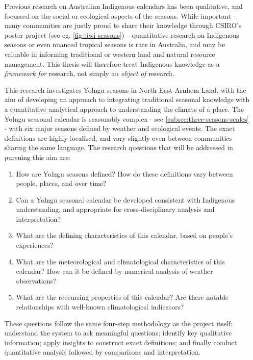 Previous research on Australian Indigenous calendars 
has been qualitative, and focussed on the social or ecological aspects of
the seasons.  While important -- many communities are justly proud to share
their knowledge through CSIRO's poster project (see eg. \cref{fig:tiwi-seasons})
-- quantitative research on Indigenous seasons or even nuanced tropical seasons
is rare in Australia, and may be valuable in informing traditional or western
land and natural resource management.  This thesis will therefore treat
Indigenous knowledge as a \emph{framework for} research, not simply an
\emph{object of} research.


This research investigates Yolngu seasons in North-East Arnhem Land, with the
aim of developing an approach to integrating traditional seasonal knowledge
with a quantitative analytical approach to understanding the climate of a
place.  The Yolngu seasonal calendar is reasonably complex - see
\cref{subsec:three-seasons-scales} - with six major seasons defined by
weather and ecological events.  The exact definitions are highly localised,
and vary slightly even between communities sharing the same language.
%
The research questions that will be addressed in pursuing this aim are:
\begin{enumerate}
\item How are Yolngu seasons defined?  How do these definitions vary between
    people, places, and over time?
\item Can a Yolngu seasonal calendar be developed consistent with Indigenous
    understanding, and appropriate for cross-disciplinary analysis and interpretation?
\item What are the defining characteristics of this calendar, based on
    people's experiences?
\item What are the meteorological and climatological characteristics of this
    calendar?  How can it be defined by numerical analysis of weather observations?
\item What are the reccurring properties of this calendar?  Are there notable
    relationships with well-known climatological indicators?
\end{enumerate}

These questions follow the same four-step methodology as the project itself:
understand the system to ask meaningful questions; identify key
qualitative information; apply insights to construct exact definitions; and
finally conduct quantitative analysis followed by comparisons and interpretation.

